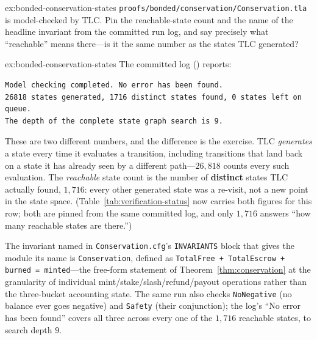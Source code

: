 \documentclass[11pt,a4paper]{article}
\theoremstyle{definition}
\theoremstyle{remark}
\begin{document}

\begin{pdexercise}[kind=Trace,rating=2]{ex:bonded-conservation-states}
\texttt{proofs/bonded/conservation/Conservation.tla} is model-checked by TLC. Pin the reachable-state count and the name of the headline invariant from the committed run log, and say precisely what ``reachable'' means there---is it the same number as the states TLC generated?
\end{pdexercise}
\begin{pdsolution}{ex:bonded-conservation-states}
The committed log () reports:
\begin{lstlisting}
Model checking completed. No error has been found.
26818 states generated, 1716 distinct states found, 0 states left on queue.
The depth of the complete state graph search is 9.
\end{lstlisting}
These are two different numbers, and the difference is the exercise. TLC \emph{generates} a state every time it evaluates a transition, including transitions that land back on a state it has already seen by a different path---$26{,}818$ counts every such evaluation. The \emph{reachable} state count is the number of \textbf{distinct} states TLC actually found, $1{,}716$: every other generated state was a re-visit, not a new point in the state space. (Table~\ref{tab:verification-status} now carries both figures for this row; both are pinned from the same committed log, and only $1{,}716$ answers ``how many reachable states are there.'')

The invariant named in \texttt{Conservation.cfg}'s \texttt{INVARIANTS} block that gives the module its name is \texttt{Conservation}, defined as \texttt{TotalFree + TotalEscrow + burned = minted}---the free-form statement of Theorem~\ref{thm:conservation} at the granularity of individual mint/stake/slash/refund/payout operations rather than the three-bucket accounting state. The same run also checks \texttt{NoNegative} (no balance ever goes negative) and \texttt{Safety} (their conjunction); the log's ``No error has been found'' covers all three across every one of the $1{,}716$ reachable states, to search depth $9$.
\end{pdsolution}
\end{document}
